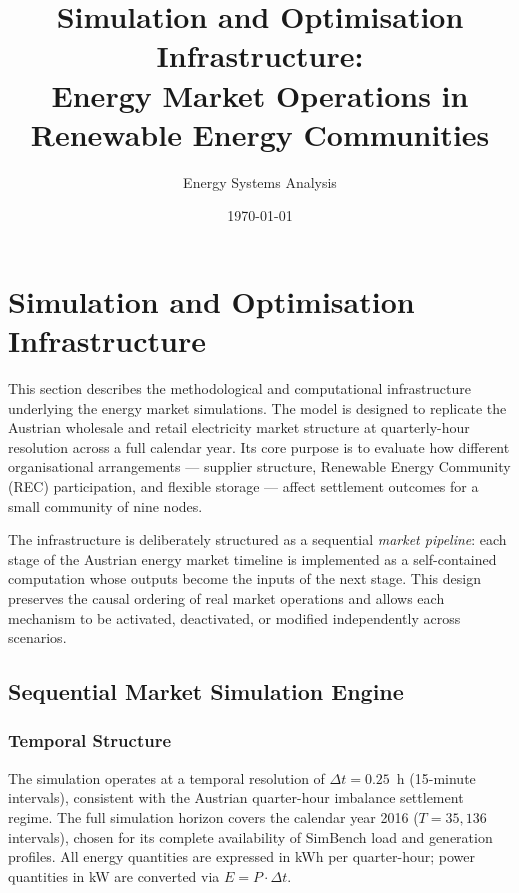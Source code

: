 \documentclass[12pt,a4paper]{article}
\title{\textbf{Simulation and Optimisation Infrastructure:\\
Energy Market Operations in Renewable Energy Communities}}
\author{Energy Systems Analysis}
\date{\today}
\begin{document}
\maketitle
\tableofcontents
\newpage

\section{Simulation and Optimisation Infrastructure}
\label{sec:infrastructure}

This section describes the methodological and computational infrastructure
underlying the energy market simulations.  The model is designed to replicate
the Austrian wholesale and retail electricity market structure at
quarterly-hour resolution across a full calendar year.  Its core purpose is
to evaluate how different organisational arrangements — supplier structure,
Renewable Energy Community (REC) participation, and flexible storage — affect
settlement outcomes for a small community of nine nodes.

The infrastructure is deliberately structured as a sequential \emph{market
pipeline}: each stage of the Austrian energy market timeline is implemented as
a self-contained computation whose outputs become the inputs of the next stage.
This design preserves the causal ordering of real market operations and allows
each mechanism to be activated, deactivated, or modified independently across
scenarios.

\subsection{Sequential Market Simulation Engine}
\label{subsec:engine}

\subsubsection{Temporal Structure}

The simulation operates at a temporal resolution of $\Delta t = 0.25$~h
(15-minute intervals), consistent with the Austrian quarter-hour imbalance
settlement regime.  The full simulation horizon covers the calendar year 2016
($T = 35{,}136$ intervals), chosen for its complete availability of SimBench
load and generation profiles.  All energy quantities are expressed in kWh per
quarter-hour; power quantities in kW are converted via
$E = P \cdot \Delta t$.
\end{document}
